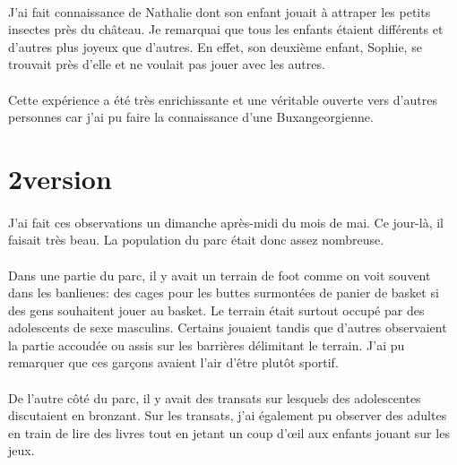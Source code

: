 \paragraph{} J'ai fait connaissance de Nathalie dont son enfant jouait à
attraper les petits insectes près du château. Je remarquai que tous les enfants
étaient différents et d'autres plus joyeux que d'autres. En effet, son deuxième
enfant, Sophie, se trouvait près d'elle et ne voulait pas jouer avec les
autres.

\paragraph{} Cette expérience a été très enrichissante et une véritable ouverte
vers d'autres personnes car j'ai pu faire la connaissance d'une
Buxangeorgienne.

\section{2\ieme version}

\paragraph{} J'ai fait ces observations un dimanche après-midi du mois de mai.
Ce jour-là, il faisait très beau. La population du parc était donc assez
nombreuse.

\paragraph{} Dans une partie du parc, il y avait un terrain de foot comme on
voit souvent dans les banlieues: des cages pour les buttes surmontées de panier
de basket si des gens souhaitent jouer au basket. Le terrain était surtout
occupé par des adolescents de sexe masculins. Certains jouaient tandis que
d'autres observaient la partie accoudée ou assis sur les barrières délimitant
le terrain. J'ai pu remarquer que ces garçons avaient l'air d'être plutôt
sportif.

\paragraph{} De l'autre côté du parc, il y avait des transats sur lesquels des
adolescentes discutaient en bronzant. Sur les transats, j'ai également pu
observer des adultes en train de lire des livres tout en jetant un coup d'œil
aux enfants jouant sur les jeux.

